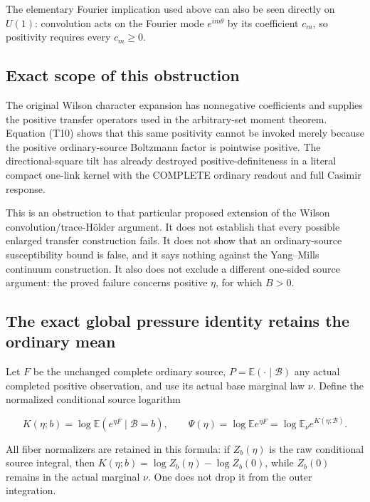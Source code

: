 \documentclass[
  11pt,
]{article}
\begin{document}
The elementary Fourier implication used above can also be seen directly
on \(U(1)\): convolution acts on the Fourier mode \(e^{im\theta}\) by
its coefficient \(c_m\), so positivity requires every \(c_m\ge0\).

\hypertarget{exact-scope-of-this-obstruction}{%
\subsection{Exact scope of this
obstruction}\label{exact-scope-of-this-obstruction}}

The original Wilson character expansion has nonnegative coefficients and
supplies the positive transfer operators used in the arbitrary-set
moment theorem. Equation (T10) shows that this same positivity cannot be
invoked merely because the positive ordinary-source Boltzmann factor is
pointwise positive. The directional-square tilt has already destroyed
positive-definiteness in a literal compact one-link kernel with the
COMPLETE ordinary readout and full Casimir response.

This is an obstruction to that particular proposed extension of the
Wilson convolution/trace-Hölder argument. It does not establish that
every possible enlarged transfer construction fails. It does not show
that an ordinary-source susceptibility bound is false, and it says
nothing against the Yang--Mills continuum construction. It also does not
exclude a different one-sided source argument: the proved failure
concerns positive \(\eta\), for which \(B>0\).

\hypertarget{the-exact-global-pressure-identity-retains-the-ordinary-mean}{%
\subsection{The exact global pressure identity retains the ordinary
mean}\label{the-exact-global-pressure-identity-retains-the-ordinary-mean}}

Let \(F\) be the unchanged complete ordinary source,
\(P=\mathbb E(\cdot\mid\mathcal B)\) any actual completed positive
observation, and use its actual base marginal law \(\nu\). Define the
normalized conditional source logarithm

\[
 K(\eta;b)
 =\log\mathbb E(e^{\eta F}\mid\mathcal B=b),
 \qquad
 \Psi(\eta)=\log\mathbb E e^{\eta F}
 =\log\mathbb E_\nu e^{K(\eta;\mathcal B)}.
 \tag{T11}
\]

All fiber normalizers are retained in this formula: if \(Z_b(\eta)\) is
the raw conditional source integral, then
\(K(\eta;b)=\log Z_b(\eta)-\log Z_b(0)\), while \(Z_b(0)\) remains in
the actual marginal \(\nu\). One does not drop it from the outer
integration.
\end{document}
